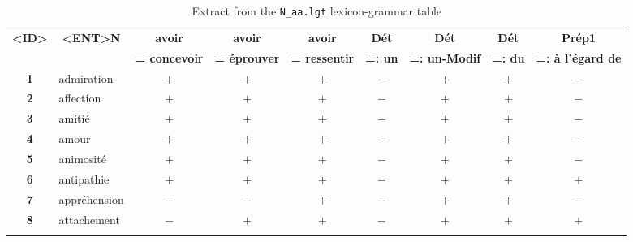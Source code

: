 \begin{table}
\sffamily
\footnotesize
\setlength{\tabcolsep}{4pt}
\begin{tabular}{c l c c c c c c c}

\lsptoprule

\textbf{<ID>}
& \multicolumn{1}{c}{ {\scriptsize\textbf{<ENT>N}}}
& {\scriptsize \textbf{avoir}}
& {\scriptsize \textbf{avoir}}
& {\scriptsize \textbf{avoir}}
& {\scriptsize \textbf{Dét}}
& {\scriptsize \textbf{Dét}}
& {\scriptsize \textbf{Dét}}
& \multicolumn{1}{c}{{\scriptsize \textbf{Prép1}}} \\[-3pt]

&
& {\scriptsize \textbf{= concevoir}}
& {\scriptsize \textbf{= éprouver}}
& {\scriptsize \textbf{= ressentir}}
& {\scriptsize \textbf{=: un}}
& {\scriptsize \textbf{=: un-Modif}}
& {\scriptsize \textbf{=: du}}
& \multicolumn{1}{c}{{\scriptsize \textbf{=: à l'égard de}}} \\

\midrule
 
{\scriptsize\textbf{1}} & admiration & $+$ & $+$ & $+$ & $-$ & $+$ & $+$ & $-$ \\
{\scriptsize\textbf{2}} & affection & $+$ & $+$ & $+$ & $-$ & $+$ & $+$ & $-$ \\
{\scriptsize\textbf{3}} & amitié & $+$ & $+$ & $+$ & $-$ & $+$ & $+$ & $-$ \\
{\scriptsize\textbf{4}} & amour & $+$ & $+$ & $+$ & $-$ & $+$ & $+$ & $-$ \\
{\scriptsize\textbf{5}} & animosité & $+$ & $+$ & $+$ & $-$ & $+$ & $+$ & $-$ \\
{\scriptsize\textbf{6}} & antipathie & $+$ & $+$ & $+$ & $-$ & $+$ & $+$ & $+$ \\
{\scriptsize\textbf{7}} & appréhension & $-$ & $-$ & $+$ & $-$ & $+$ & $+$ & $-$ \\
{\scriptsize\textbf{8}} & attachement & $-$ & $+$ & $+$ & $-$ & $+$ & $+$ & $+$ \\

\lspbottomrule

\end{tabular}
\caption[Extract from the \texttt{N\_aa.lgt} lexicon-grammar table]{Extract from the \texttt{N\_aa.lgt} lexicon-grammar table\footnotemark}\label{tab:Table-N_aa.lgt}
\end{table}

